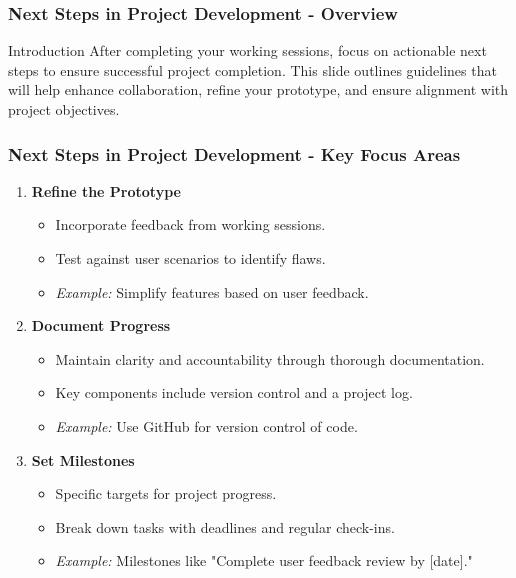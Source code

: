 \documentclass[aspectratio=169]{beamer}
\begin{document}
\begin{frame}[fragile]
    \frametitle{Next Steps in Project Development - Overview}
    \begin{block}{Introduction}
        After completing your working sessions, focus on actionable next steps to ensure successful project completion. This slide outlines guidelines that will help enhance collaboration, refine your prototype, and ensure alignment with project objectives.
    \end{block}
\end{frame}

\begin{frame}[fragile]
    \frametitle{Next Steps in Project Development - Key Focus Areas}
    \begin{enumerate}
        \item \textbf{Refine the Prototype}
            \begin{itemize}
                \item Incorporate feedback from working sessions.
                \item Test against user scenarios to identify flaws.
                \item \textit{Example:} Simplify features based on user feedback.
            \end{itemize}
        
        \item \textbf{Document Progress}
            \begin{itemize}
                \item Maintain clarity and accountability through thorough documentation.
                \item Key components include version control and a project log.
                \item \textit{Example:} Use GitHub for version control of code.
            \end{itemize}
        
        \item \textbf{Set Milestones}
            \begin{itemize}
                \item Specific targets for project progress.
                \item Break down tasks with deadlines and regular check-ins.
                \item \textit{Example:} Milestones like "Complete user feedback review by [date]."
            \end{itemize}
    \end{enumerate}
\end{frame}
\end{document}
